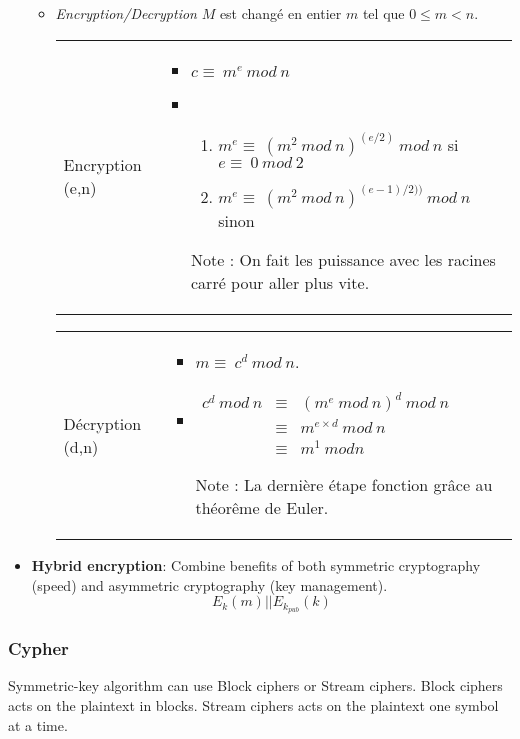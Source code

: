 \begin{itemize}
\begin{itemize}
\item \textit{Encryption/Decryption}
$M$ est changé en entier $m$ tel que $0 \le m < n$.\\

\begin{tabular}{m{3cm}m{12cm}}
Encryption (e,n)
&
\begin{itemize}
	\item $c\equiv\ m^e\ mod\ n$
	\item  \begin{enumerate}
		\item $m^e\equiv\ (m^2\ mod\ n)^{(e/2)}\ mod\ n$ si $e\equiv\ 0\ mod\ 2$
		\item $m^e\equiv\ (m^2\ mod\ n)^{(e-1)/2))}\ mod\ n$ sinon
	\end{enumerate}
\item[Note]: On fait les puissance avec les racines carré pour aller plus vite.
\end{itemize}
\end{tabular}


\begin{tabular}{m{3cm}m{12cm}}
Décryption (d,n)
&
\begin{itemize}
    \item $m\equiv\ c^d\ mod\ n$.
    \item 
        $\begin{array}{rcr}
            c^d\ mod\ n & \equiv & (m^e\ mod\ n)^d\ mod\ n\\
            & \equiv & m^{e\times d}\ mod\ n\\
            & \equiv& m^1\ mod n
        \end{array}$

    \item[Note]: La dernière étape fonction grâce au théorême de Euler.
\end{itemize}
\end{tabular}
\end{itemize}


    \item \textbf{Hybrid encryption}: Combine benefits of both symmetric cryptography (speed) and
        asymmetric cryptography (key management).
        $$E_k(m) || E_{k_{pub}}(k)$$
\end{itemize}

\subsubsection{Cypher}
Symmetric-key algorithm can use Block ciphers or Stream ciphers. Block ciphers
acts on the plaintext in blocks. Stream ciphers acts on the plaintext one
symbol at a time.


